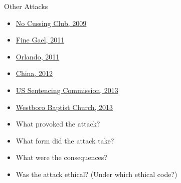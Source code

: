 \documentclass{beamer}
\begin{document}
\begin{frame}{Other Attacks}
\begin{itemize}
\item \href{http://abclocal.go.com/kabc/story?id=6606733}{No Cussing Club, 2009}
\item \href{http://www.thejournal.ie/fine-gael-website-defaced-by-anonymous-hacktivists-66151-Jan2011/}{Fine Gael, 2011}
\item \href{http://www.nytimes.com/2011/07/01/us/01orlando.html?_r=0}{Orlando, 2011}
\item \href{http://www.zdnet.com/blog/security/anonymous-hacks-hundreds-of-chinese-government-sites/11303}{China, 2012}
\item \href{http://www.zdnet.com/feds-stumbling-after-anonymous-launches-operation-last-resort-7000010541/}{US Sentencing Commission, 2013}
\item \href{http://www.nbcnews.com/technology/anonymous-brandjacks-westboro-baptist-church-facebook-1C9395459}{Westboro Baptist Church, 2013}
\end{itemize}
\bigskip
\pause
\begin{itemize}
\item What provoked the attack?
\item What form did the attack take?
\item What were the consequences?
\item Was the attack ethical? (Under which ethical code?)
\end{itemize}
\end{frame}
\end{document}
